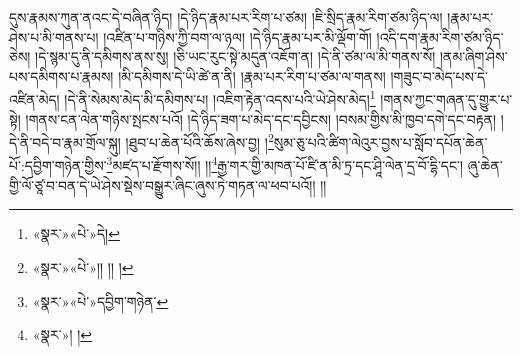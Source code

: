 དུས་རྣམས་ཀུན་ནའང་དེ་བཞིན་ཉིད། །དེ་ཉིད་རྣམ་པར་རིག་པ་ཙམ། །ཇི་སྲིད་རྣམ་རིག་ཙམ་ཉིད་ལ། །རྣམ་པར་ཤེས་པ་མི་གནས་པ། །འཛིན་པ་གཉིས་ཀྱི་བག་ལ་ཉལ། །དེ་ཉིད་རྣམ་པར་མི་ལྡོག་གོ། །འདི་དག་རྣམ་རིག་ཙམ་ཉིད་ཅེས། །དེ་སྙམ་དུ་ནི་དམིགས་ནས་སུ། །ཅི་ཡང་རུང་སྟེ་མདུན་འཇོག་ན། །དེ་ནི་ཙམ་ལ་མི་གནས་སོ། །ནམ་ཞིག་ཤེས་པས་དམིགས་པ་རྣམས། །མི་དམིགས་དེ་ཡི་ཚེ་ན་ནི། །རྣམ་པར་རིག་པ་ཙམ་ལ་གནས། །གཟུང་བ་མེད་པས་དེ་འཛིན་མེད། །དེ་ནི་སེམས་མེད་མི་དམིགས་པ། །འཇིག་རྟེན་འདས་པའི་ཡེ་ཤེས་མེད།\footnote{«སྣར་»«པེ་»དེ།} །གནས་ཀྱང་གཞན་དུ་གྱུར་པ་སྟེ། །གནས་ངན་ལེན་གཉིས་སྤངས་པའོ། །དེ་ཉིད་ཟག་པ་མེད་དང་དབྱིངས། །བསམ་གྱིས་མི་ཁྱབ་དགེ་དང་བརྟན། །དེ་ནི་བདེ་བ་རྣམ་གྲོལ་སྐུ། །ཐུབ་པ་ཆེན་པོའི་ཆོས་ཞེས་བྱ། །\footnote{«སྣར་»«པེ་»།། །། །}སུམ་ཅུ་པའི་ཚིག་ལེའུར་བྱས་པ་སློབ་དཔོན་ཆེན་པོ་:དབྱིག་གཉེན་གྱིས་\footnote{«སྣར་»«པེ་»དབྱིག་གཉེན་}མཛད་པ་རྫོགས་སོ།། །།\footnote{«སྣར་»། །}རྒྱ་གར་གྱི་མཁན་པོ་ཛི་ན་མི་ཏྲ་དང་ཤཱི་ལེན་དྲ་བོ་དྷི་དང་། ཞུ་ཆེན་གྱི་ལོ་ཙཱ་བ་བན་དེ་ཡེ་ཤེས་སྡེས་བསྒྱུར་ཞིང་ཞུས་ཏེ་གཏན་ལ་ཕབ་པའོ།། །།